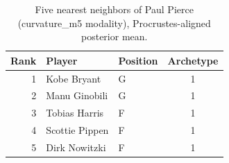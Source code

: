 \begin{table}[htbp]
  \centering\small
  \begin{tabular}{rllc}
    \toprule
    Rank & Player & Position & Archetype \\
    \midrule
    1 & Kobe Bryant & G & 1 \\
    2 & Manu Ginobili & G & 1 \\
    3 & Tobias Harris & F & 1 \\
    4 & Scottie Pippen & F & 1 \\
    5 & Dirk Nowitzki & F & 1 \\
    \bottomrule
  \end{tabular}
  \caption{Five nearest neighbors of Paul Pierce (curvature_m5 modality), Procrustes-aligned posterior mean.}
  \label{tab:Paul_Pierce_neighbors_curvature_m5}
\end{table}

